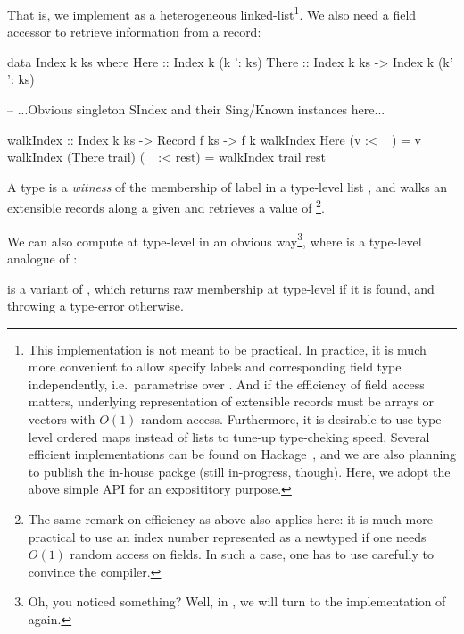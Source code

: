 \documentclass[demotion-paper.tex]{subfiles}
\begin{document}
That is, we implement  as a heterogeneous linked-list\footnote{%
This implementation is not meant to be practical.
In practice, it is much more convenient to allow specify labels and corresponding field type independently, i.e.\ parametrise  over .
And if the efficiency of field access matters, underlying representation of extensible records must be arrays or vectors with $O(1)$ random access.
Furthermore, it is desirable to use type-level ordered maps instead of lists to tune-up type-cheking speed.
Several efficient implementations can be found on Hackage~\cite{Kinoshita:2020aa,Sterling:2020aa,Thiemann:2020aa}, and we are also planning to publish the in-house packge (still in-progress, though).
Here, we adopt the above simple API for an exposititory purpose.}.
We also need a field accessor to retrieve information from a record:
\begin{code}
data Index k ks where
  Here  :: Index k (k ': ks)
  There :: Index k ks -> Index k (k' ': ks)

-- ...Obvious singleton SIndex and their Sing/Known instances here...

walkIndex :: Index k ks -> Record f ks -> f k
walkIndex Here (v :< _) = v
walkIndex (There trail) (_ :< rest) = walkIndex trail rest  
\end{code}
A type  is a \emph{witness} of the membership of label  in a type-level list , and  walks an extensible records along a given  and retrieves a value of \footnote{The same remark on efficiency as above also applies here: it is much more practical to use an index number represented as a newtyped  if one needs $O(1)$ random access on fields.
In such a case, one has to use  carefully to convince the compiler.}.

We can also compute  at type-level in an obvious way\footnote{Oh, you noticed something? Well, in , we will turn to the implementation of  again.}, where \hask{(<$>)} is a type-level analogue of :
 is a variant of , which returns raw membership at type-level if it is found, and throwing a type-error otherwise.
\end{document}
